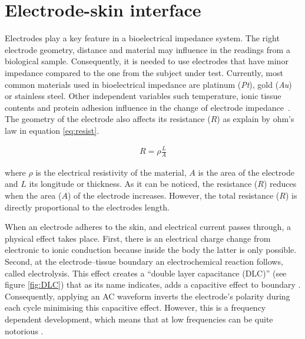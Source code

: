 \section{Electrode-skin interface}  %
\label{section impedance electrodes}
Electrodes play a key feature in a bioelectrical impedance system. The right electrode geometry, distance and material may influence in the readings from a biological sample. Consequently, it is needed to use electrodes that have minor impedance compared to the one from the subject under test. Currently, most common materials used in bioelectrical impedance are platinum (\textit{Pt}), gold (\textit{Au}) or stainless steel. Other independent variables such temperature, ionic tissue contents and protein adhesion influence in the change of electrode impedance~\cite{ivorra2003bioimpedance,martinsen2011bioimpedance}. The geometry of the electrode also affects its resistance ($R$) as explain by ohm’s law in equation \ref{eq:resist}.

\begin{align}
	\label{eq:resist}
	R = \rho \frac{L}{A}
\end{align}

where $\rho$ is the electrical resistivity of the material, $A$ is the area of the electrode and $L$ its longitude or thickness. As it can be noticed, the resistance ($R$) reduces when the area ($A$) of the electrode increases. However, the total resistance ($R$) is directly proportional to the electrodes length. 

When an electrode adheres to the skin, and electrical current passes through, a physical effect takes place. First, there is an electrical charge change from electronic to ionic conduction because inside the body the latter is only possible. Second, at the electrode–tissue boundary an electrochemical reaction follows, called electrolysis. This effect creates a “double layer capacitance (DLC)” (see figure \ref{fig:DLC}) that as its name indicates, adds a capacitive effect to boundary \cite{lvovich2012impedance}. Consequently, applying an AC waveform inverts the electrode’s polarity during each cycle minimising this capacitive effect. However, this is a frequency dependent development, which means that at low frequencies can be quite notorious \cite{bertemes2002tissue}.  

